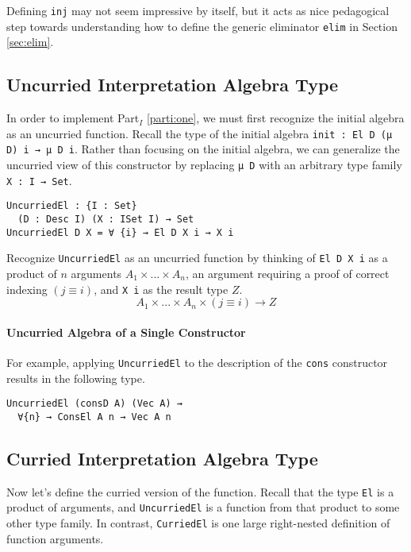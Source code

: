 \documentclass[preprint,nonatbib]{sigplanconf}
\newcommand{\refsec}[1]{Section \ref{sec:#1}}
\newcommand{\refparti}[1]{Part$_I$ \ref{parti:#1}}
\begin{document}
Defining {\tt inj} may not seem impressive by itself, but it acts as
nice pedagogical step towards understanding how to define the generic
eliminator {\tt elim} in \refsec{elim}.

\subsection{Uncurried Interpretation Algebra Type}

In order to implement \refparti{one}, we must first recognize the
initial algebra as an uncurried function. Recall the type of the
initial algebra {\tt init : El D (μ D) i → μ D i}. Rather than
focusing on the initial algebra, we can generalize the uncurried view
of this constructor by replacing {\tt μ D} with an arbitrary
type family {\tt X : I → Set}.

\begin{verbatim}
UncurriedEl : {I : Set}
  (D : Desc I) (X : ISet I) → Set
UncurriedEl D X = ∀ {i} → El D X i → X i
\end{verbatim}

Recognize {\tt UncurriedEl} as an uncurried function by thinking of
{\tt El D X i} as a product of $n$ arguments $A_1 × ... × A_n$, an
argument requiring a proof of correct indexing $(j≡i)$, and
{\tt X i} as the result type $Z$.
\[
A_1 × ... × A_n × (j ≡ i) → Z
\]

\paragraph{Uncurried Algebra of a Single Constructor}

For example, applying {\tt UncurriedEl} to the description of the
{\tt cons} constructor results in the following type.

\begin{verbatim}
UncurriedEl (consD A) (Vec A) ⇝
  ∀{n} → ConsEl A n → Vec A n
\end{verbatim}

\subsection{Curried Interpretation Algebra Type}

Now let's define the curried version of the function. Recall that the
type {\tt El} is a product of arguments, and {\tt UncurriedEl} is a
function from that product to some other type family. In contrast,
{\tt CurriedEl} is one large right-nested definition of function
arguments.
\end{document}
